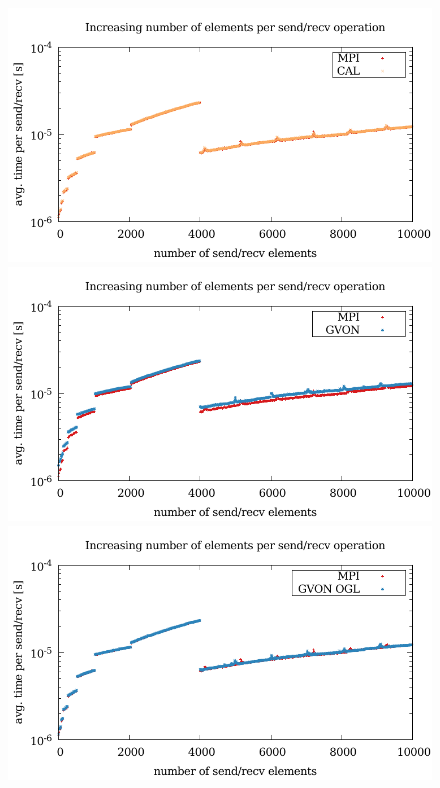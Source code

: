 \begin{figure}[H]
  \begin{minipage}[t]{0.5\textwidth}
    \includegraphics[width=\textwidth]{plots/50_nsize_cal_laser}
    \includegraphics[width=\textwidth]{plots/50_nsize_gvon_laser}
    \includegraphics[width=\textwidth]{plots/50_nsize_one_lookup_gvon_laser}

\end{minipage}
\end{figure}
